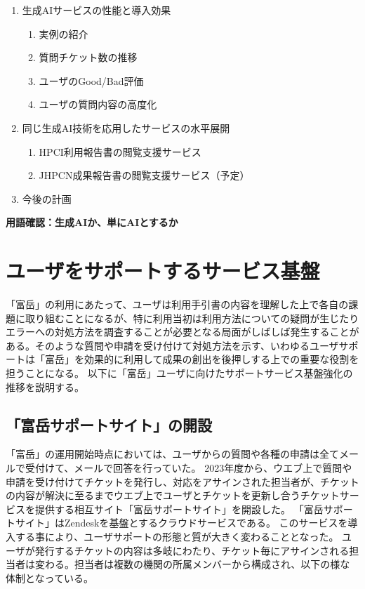 \documentclass{jsaxiesproc}
\begin{document}
\begin{enumerate}
\item 生成AIサービスの性能と導入効果
	\begin{enumerate}
		\item 実例の紹介
		\item 質問チケット数の推移
		\item ユーザのGood/Bad評価
		\item ユーザの質問内容の高度化
	\end{enumerate}

\item 同じ生成AI技術を応用したサービスの水平展開
	\begin{enumerate}
		\item HPCI利用報告書の閲覧支援サービス
		\item JHPCN成果報告書の閲覧支援サービス（予定）
	\end{enumerate}

\item 今後の計画

\end{enumerate}

\textbf{用語確認：生成AIか、単にAIとするか}

\clearpage



\section{ユーザをサポートするサービス基盤}
「富岳」の利用にあたって、ユーザは利用手引書の内容を理解した上で各自の課題に取り組むことになるが、特に利用当初は利用方法についての疑問が生じたりエラーへの対処方法を調査することが必要となる局面がしばしば発生することがある。そのような質問や申請を受け付けて対処方法を示す、いわゆるユーザサポートは「富岳」を効果的に利用して成果の創出を後押しする上での重要な役割を担うことになる。
以下に「富岳」ユーザに向けたサポートサービス基盤強化の推移を説明する。

\subsection{「富岳サポートサイト」の開設}

「富岳」の運用開始時点においては、ユーザからの質問や各種の申請は全てメールで受付けて、メールで回答を行っていた。
2023年度から、ウエブ上で質問や申請を受け付けてチケットを発行し、対応をアサインされた担当者が、チケットの内容が解決に至るまでウエブ上でユーザとチケットを更新し合うチケットサービスを提供する相互サイト「富岳サポートサイト」を開設した。
「富岳サポートサイト」はZendeskを基盤とするクラウドサービスである。
このサービスを導入する事により、ユーザサポートの形態と質が大きく変わることとなった。
ユーザが発行するチケットの内容は多岐にわたり、チケット毎にアサインされる担当者は変わる。担当者は複数の機関の所属メンバーから構成され、以下の様な体制となっている。
\end{document}
